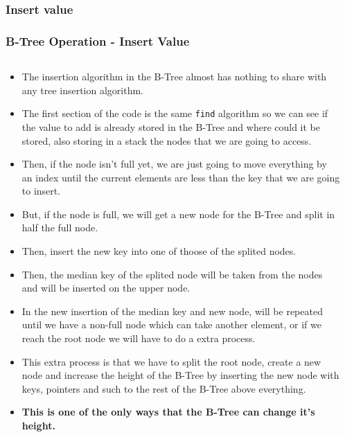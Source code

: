 \documentclass{beamer}
\begin{document}
\begin{frame}
    \subsubsection{Insert value}
    \frametitle{B-Tree Operation - Insert Value}
    \begin{columns}
        \begin{column}{\textlecolumn}
            \begin{block}{}
                \begin{itemize}
                    \item The insertion algorithm in the B-Tree almost has nothing to share with any tree insertion algorithm.
                    \item The first section of the code is the same \lstinline|find| algorithm so we can see if the value to add is already 
                        stored in the B-Tree and where could it be stored, also storing in a stack the nodes that we are going to access.
                    \item Then, if the node isn't full yet, we are just going to move everything by an index until the current elements are 
                        less than the key that we are going to insert.
                    \item But, if the node is full, we will get a new node for the B-Tree and split in half the full node.
                    \item Then, insert the new key into one of thoose of the splited nodes.
                    \item Then, the median key of the splited node will be taken from the nodes and will be inserted on the upper node.
                    \item In the new insertion of the median key and new node, will be repeated until we have a non-full node which can 
                        take another element, or if we reach the root node we will have to do a extra process.
                    \item This extra process is that we have to split the root node, create a new node and increase the height of the B-Tree by inserting the new node with 
                        keys, pointers and such to the rest of the B-Tree above everything.
                    \item \textbf{This is one of the only ways that the B-Tree can change it's height.}
                \end{itemize}
            \end{block}
        \end{column}
        \begin{column}{\textricolumn}
        \end{column}
    \end{columns}
    

\end{frame}
\end{document}
